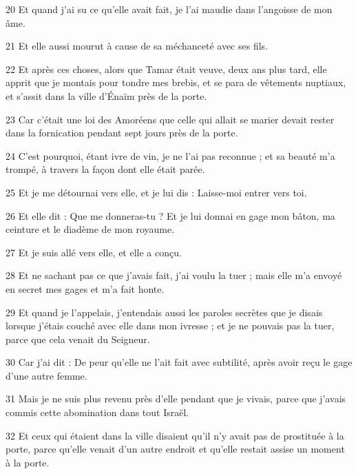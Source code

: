 \par 20 Et quand j'ai su ce qu'elle avait fait, je l'ai maudie dans l'angoisse de mon âme.

\par 21 Et elle aussi mourut à cause de sa méchanceté avec ses fils.

\par 22 Et après ces choses, alors que Tamar était veuve, deux ans plus tard, elle apprit que je montais pour tondre mes brebis, et se para de vêtements nuptiaux, et s'assit dans la ville d'Énaïm près de la porte.

\par 23 Car c'était une loi des Amoréens que celle qui allait se marier devait rester dans la fornication pendant sept jours près de la porte.

\par 24 C'est pourquoi, étant ivre de vin, je ne l'ai pas reconnue ; et sa beauté m'a trompé, à travers la façon dont elle était parée.

\par 25 Et je me détournai vers elle, et je lui dis : Laisse-moi entrer vers toi.

\par 26 Et elle dit : Que me donneras-tu ? Et je lui donnai en gage mon bâton, ma ceinture et le diadème de mon royaume.

\par 27 Et je suis allé vers elle, et elle a conçu.

\par 28 Et ne sachant pas ce que j'avais fait, j'ai voulu la tuer ; mais elle m'a envoyé en secret mes gages et m'a fait honte.

\par 29 Et quand je l'appelais, j'entendais aussi les paroles secrètes que je disais lorsque j'étais couché avec elle dans mon ivresse ; et je ne pouvais pas la tuer, parce que cela venait du Seigneur.

\par 30 Car j'ai dit : De peur qu'elle ne l'ait fait avec subtilité, après avoir reçu le gage d'une autre femme.

\par 31 Mais je ne suis plus revenu près d'elle pendant que je vivais, parce que j'avais commis cette abomination dans tout Israël.

\par 32 Et ceux qui étaient dans la ville disaient qu'il n'y avait pas de prostituée à la porte, parce qu'elle venait d'un autre endroit et qu'elle restait assise un moment à la porte.

